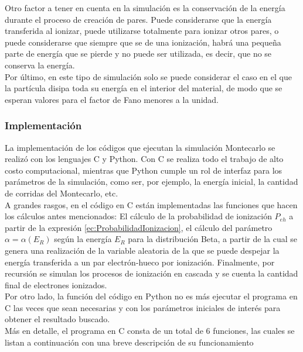 \indent Otro factor a tener en cuenta en la simulación es la conservación de la energía durante el proceso de creación de pares. Puede considerarse que la energía transferida al ionizar, puede utilizarse totalmente para ionizar otros pares, o puede considerarse que siempre que se de una ionización, habrá una pequeña parte de energía que se pierde y no puede ser utilizada, es decir, que no se conserva la energía.\\
\indent Por último, en este tipo de simulación solo se puede considerar el caso en el que la partícula disipa toda su energía en el interior del material, de modo que se esperan valores para el factor de Fano menores a la unidad.

\subsubsection*{Implementación}
\noindent La implementación de los códigos que ejecutan la simulación Montecarlo se realizó con los lenguajes C y Python. Con C se realiza todo el trabajo de alto costo computacional, mientras que Python cumple un rol de interfaz para los parámetros de la simulación, como ser, por ejemplo, la energía inicial, la cantidad de corridas del Montecarlo, etc.\\
\indent A grandes rasgos, en el código en C están implementadas las funciones que hacen los cálculos antes mencionados: El cálculo de la probabilidad de ionización $P_{eh}$ a partir de la expresión \eqref{ec:ProbabilidadIonizacion}, el cálculo del parámetro $\alpha = \alpha(E_{R})$ según la energía $E_{R}$ para la distribución Beta, a partir de la cual se genera una realización de la variable aleatoria de la que se puede despejar la energía transferida a un par electrón-hueco por ionización. Finalmente, por recursión se simulan los procesos de ionización en cascada y se cuenta la cantidad final de electrones ionizados.\\
\indent Por otro lado, la función del código en Python no es más ejecutar el programa en C las veces que sean necesarias y con los parámetros iniciales de interés para obtener el resultado buscado.\\
\indent Más en detalle, el programa en C consta de un total de $6$ funciones, las cuales se listan a continuación con una breve descripción de su funcionamiento
